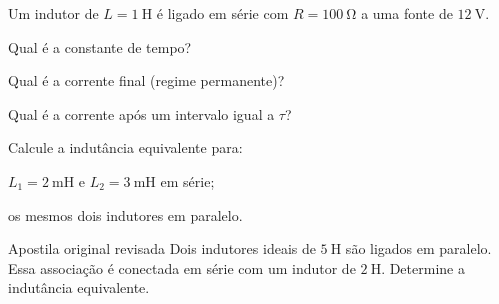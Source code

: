 \blocoaplicacao

\begin{questao}[2]{}
Um indutor de $L = \SI{1}{\henry}$ é ligado em série com $R = \SI{100}{\ohm}$ a
uma fonte de $\SI{12}{\volt}$.
\begin{itensq}
\item Qual é a constante de tempo?
\item Qual é a corrente final (regime permanente)?
\item Qual é a corrente após um intervalo igual a $\tau$?
\end{itensq}
\end{questao}

\begin{questao}[2]{}
Calcule a indutância equivalente para:
\begin{itensq}
\item $L_1 = \SI{2}{\milli\henry}$ e $L_2 = \SI{3}{\milli\henry}$ em série;
\item os mesmos dois indutores em paralelo.
\end{itensq}
\end{questao}

\begin{questao}[2]{Apostila original revisada}
Dois indutores ideais de $\SI{5}{\henry}$ são ligados em paralelo. Essa associação
é conectada em série com um indutor de $\SI{2}{\henry}$. Determine a indutância
equivalente.
\end{questao}

